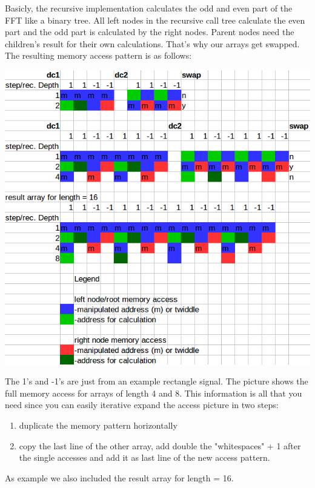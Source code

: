 Basicly, the recursive implementation calculates the odd and even part of the FFT like a binary tree. All left nodes in the recursive call tree calculate the even part and the odd part is calculated by the right nodes. Parent nodes need the children's result for their own calculations. That's why our arrays get swapped. 
The resulting memory access pattern is as follows:
\begin{center}
\includegraphics[width=\textwidth]{memacc.png}
\end{center}
The 1's and -1's are just from an example rectangle signal. The picture shows the full memory access for arrays of length 4 and 8. This information is all that you need since you can easily iterative expand the access picture in two steps:
\begin{enumerate}
\item duplicate the memory pattern horizontally
\item copy the last line of the other array, add double the "whitespaces" + 1 after the single accesses and add it as last line of the new access pattern. 
\end{enumerate}
As example we also included the result array for length = 16.
